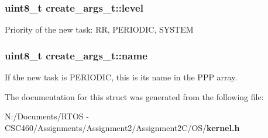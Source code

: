 \subsubsection{\setlength{\rightskip}{0pt plus 5cm}uint8\_\-t {\bf create\_\-args\_\-t::level}}\label{structcreate__args__t_76db650f9bfb5f1ce63e251ce92925ba}


Priority of the new task: RR, PERIODIC, SYSTEM 
\subsubsection{\setlength{\rightskip}{0pt plus 5cm}uint8\_\-t {\bf create\_\-args\_\-t::name}}\label{structcreate__args__t_672ed1debd4dda6dfe67983ca30de527}


If the new task is PERIODIC, this is its name in the PPP array. 

The documentation for this struct was generated from the following file:\begin{CompactItemize}
\item 
N:/Documents/RTOS - CSC460/Assignments/Assignment2/Assignment2C/OS/{\bf kernel.h}\end{CompactItemize}
